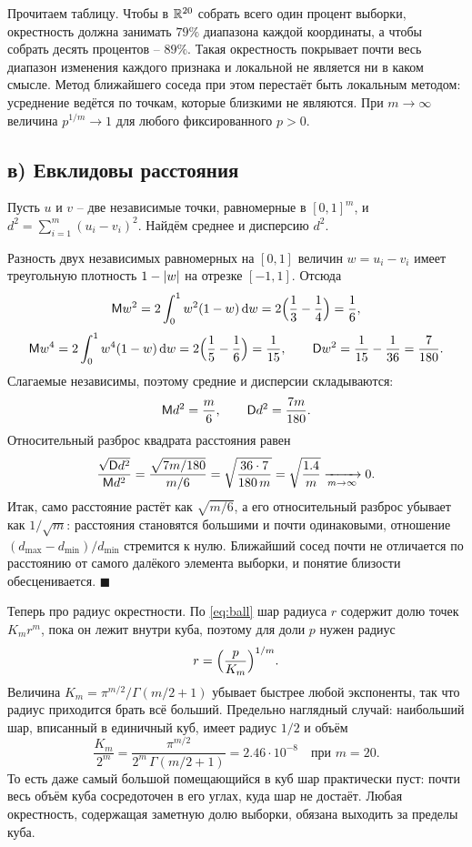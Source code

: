 \documentclass[12pt,a4paper]{article}
\begin{document}
Прочитаем таблицу. Чтобы в $\mathbb{R}^{20}$ собрать всего один процент выборки,
окрестность должна занимать $79\%$ диапазона каждой координаты, а чтобы собрать
десять процентов -- $89\%$. Такая окрестность покрывает почти весь диапазон
изменения каждого признака и локальной не является ни в каком смысле. Метод
ближайшего соседа при этом перестаёт быть локальным методом: усреднение ведётся
по точкам, которые близкими не являются. При $m \to \infty$ величина
$p^{1/m} \to 1$ для любого фиксированного $p > 0$.

\subsection*{в) Евклидовы расстояния}

\resh Пусть $u$ и $v$ -- две независимые точки, равномерные в $[0,1]^m$, и
$d^2 = \sum_{i=1}^{m}(u_i - v_i)^2$. Найдём среднее и дисперсию $d^2$.

Разность двух независимых равномерных на $[0,1]$ величин $w = u_i - v_i$ имеет
треугольную плотность $1 - \left\lvert w \right\rvert$ на отрезке $[-1,1]$. Отсюда
\[
  \mathsf{M} w^2 = 2\int_0^1 w^2(1-w)\,\mathrm{d} w = 2\Bigl(\frac13 - \frac14\Bigr) = \frac16,
\]
\[
  \mathsf{M} w^4 = 2\int_0^1 w^4(1-w)\,\mathrm{d} w = 2\Bigl(\frac15 - \frac16\Bigr) = \frac{1}{15},
  \qquad
  \mathsf{D} w^2 = \frac{1}{15} - \frac{1}{36} = \frac{7}{180} .
\]
Слагаемые независимы, поэтому средние и дисперсии складываются:
\[
  \mathsf{M} d^2 = \frac{m}{6}, \qquad \mathsf{D} d^2 = \frac{7m}{180} .
\]
Относительный разброс квадрата расстояния равен
\begin{equation}\label{eq:conc}
  \frac{\sqrt{\mathsf{D} d^2}}{\mathsf{M} d^2}
  = \frac{\sqrt{7m/180}}{m/6}
  = \sqrt{\frac{36 \cdot 7}{180\,m}}
  = \sqrt{\frac{1.4}{m}}
  \xrightarrow[m \to \infty]{} 0 .
\end{equation}
Итак, само расстояние растёт как $\sqrt{m/6}$, а его относительный разброс
убывает как $1/\sqrt{m}$: расстояния становятся большими и почти одинаковыми,
отношение $(d_{\max} - d_{\min})/d_{\min}$ стремится к нулю. Ближайший сосед
почти не отличается по расстоянию от самого далёкого элемента выборки, и понятие
близости обесценивается. $\blacksquare$

Теперь про радиус окрестности. По \eqref{eq:ball} шар радиуса $r$ содержит долю
точек $K_m r^m$, пока он лежит внутри куба, поэтому для доли $p$ нужен радиус
\[
  r = \Bigl(\frac{p}{K_m}\Bigr)^{1/m} .
\]
Величина $K_m = \pi^{m/2}/\Gamma(m/2+1)$ убывает быстрее любой экспоненты, так
что радиус приходится брать всё больший. Предельно наглядный случай: наибольший
шар, вписанный в единичный куб, имеет радиус $1/2$ и объём
\[
  \frac{K_m}{2^m}
  = \frac{\pi^{m/2}}{2^m\,\Gamma(m/2+1)}
  = 2.46\cdot10^{-8} \quad\text{при } m = 20 .
\]
То есть даже самый большой помещающийся в куб шар практически пуст: почти весь
объём куба сосредоточен в его углах, куда шар не достаёт. Любая окрестность,
содержащая заметную долю выборки, обязана выходить за пределы куба.
\end{document}
